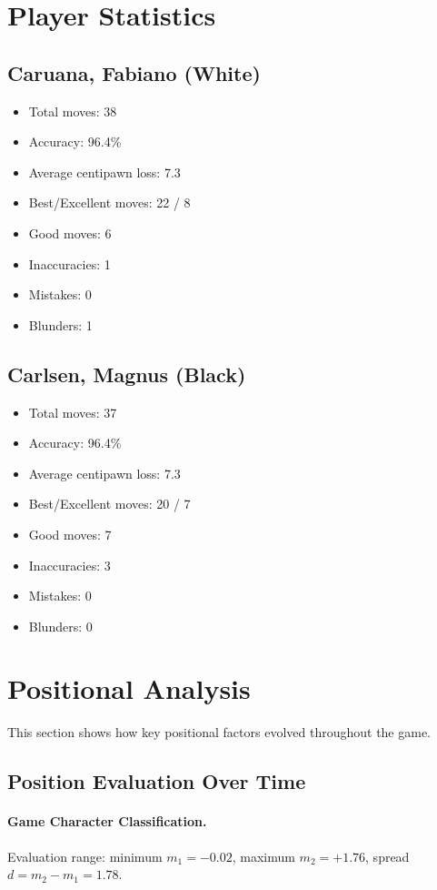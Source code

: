 \documentclass[11pt]{book}
\begin{document}
\section{Player Statistics}

\subsection{Caruana, Fabiano (White)}
\begin{itemize}
\item Total moves: 38
\item Accuracy: 96.4\%
\item Average centipawn loss: 7.3
\item Best/Excellent moves: 22 / 8
\item Good moves: 6
\item Inaccuracies: 1
\item Mistakes: 0
\item Blunders: 1
\end{itemize}

\subsection{Carlsen, Magnus (Black)}
\begin{itemize}
\item Total moves: 37
\item Accuracy: 96.4\%
\item Average centipawn loss: 7.3
\item Best/Excellent moves: 20 / 7
\item Good moves: 7
\item Inaccuracies: 3
\item Mistakes: 0
\item Blunders: 0
\end{itemize}

\section{Positional Analysis}

This section shows how key positional factors evolved throughout the game.

\subsection{Position Evaluation Over Time}

\paragraph{Game Character Classification.}
Evaluation range: minimum $m_1 = -0.02$, maximum $m_2 = +1.76$, spread $d = m_2 - m_1 = 1.78$.
\end{document}
